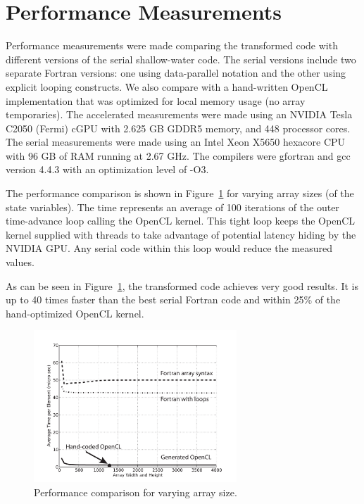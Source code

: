 \section{Performance Measurements}

Performance measurements were made comparing the transformed code with
different versions of the serial shallow-water code.  The serial
versions include two separate Fortran versions:
one using data-parallel notation and the other using explicit looping
constructs.
We also compare with a hand-written OpenCL implementation
that was optimized for local memory usage (no array temporaries).  The
accelerated measurements were made using an NVIDIA Tesla C2050 (Fermi) cGPU with
2.625 GB GDDR5 memory, and 448 processor cores.  The serial
measurements were made using an Intel Xeon X5650 hexacore CPU with 96 GB of RAM
running at 2.67 GHz.  The compilers were gfortran and gcc version 4.4.3
with an optimization level of -O3.



The performance comparison is shown in Figure~\ref{fig:cl-performance} for
varying array sizes (of the state variables).  The time represents an average
of 100 iterations of the outer time-advance loop calling the OpenCL kernel.
This tight loop keeps the OpenCL kernel supplied with threads to take
advantage of potential latency hiding by the NVIDIA GPU.  Any serial code
within this loop would reduce the measured values.

As can be seen in Figure~\ref{fig:cl-performance}, the transformed code achieves very
good results.  It is up to 40 times faster than the best serial Fortran code and
within 25\% of the hand-optimized OpenCL kernel.


\begin{figure}[!t]
\centering
\includegraphics[width=3in]{cl-performance.pdf}
\caption{Performance comparison for varying array size.}
\label{fig:cl-performance}
\end{figure}
